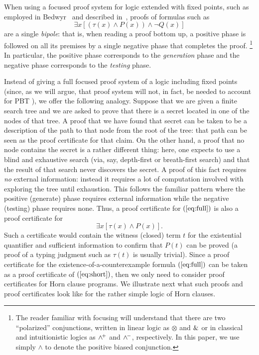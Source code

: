 When using a focused proof system for logic extended with fixed
points, such as  employed in Bedwyr~\cite{baelde07cade} and described
in~\cite{baelde12tocl,heath17linearity}, proofs of formulas such as
\[
  \exists x [(\tau(x)\wedge P(x)) \wedge \neg Q(x)]
  \tag{*}\label{eq:full}
\]
are a single \emph{bipole}: that is, when reading a proof bottom up, a
positive phase is followed on all its premises by a single negative
phase that completes the proof.%
\footnote{The reader familiar with focusing will understand that there
are two ``polarized'' conjunctions, written in linear logic as
$\otimes$ and $\&$ or in classical and intuitionistic logics as
$\wedge^{\!+}$ and $\wedge^{\!-}$, respectively.  In this paper, we use simply
$\wedge$ to denote the positive biased conjunction.}
%
In particular, the positive phase corresponds to the \emph{generation} phase
and the negative phase corresponds to the \emph{testing} phase.
%

Instead of giving a full focused proof system of a logic including
fixed points (since, as we will argue, that proof system will not, in
fact, be needed to account for PBT ), we offer the following analogy.
%
Suppose that we are given a finite search tree and we are asked to
prove that there is a secret located in one of the nodes of that
tree.
%
A proof that we have found that secret can be taken to be a
description of the path to that node from the root of the tree: that
path can be seen as the proof certificate for that claim.
%
On the other hand, a proof that no node contains the secret is a
rather different thing: here, one expects to use a blind and
exhaustive search (via, say, depth-first or breath-first search) and
that the result of that search never discovers the secret.
%
A proof of this fact requires \emph{no} external information: instead it
requires a lot of computation involved with exploring the tree until
exhaustion.
%
This follows the familiar pattern where the positive (generate) phase
requires external information while the negative (testing) phase
requires none.
%
Thus, a proof certificate for $(\ref{eq:full})$ is also a proof
certificate for 
\[
  \exists x [\tau(x)\wedge P(x)].
  \tag{**}\label{eq:short}
\]
Such a certificate would contain the witness (closed) term $t$ for the
existential quantifier and sufficient information to confirm that
$P(t)$ can be proved (a proof of a typing judgment such as $\tau(t)$
is usually trivial).
%
Since a proof certificate for the existence-of-a-counterexample formula
$(\ref{eq:full})$ can be taken as a proof certificate of
$(\ref{eq:short})$, then we only need to consider proof certificates
for Horn clause programs.
%
We illustrate next what such proofs and proof certificates look like
for the rather simple logic of Horn clauses.


